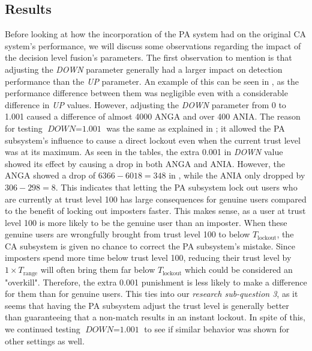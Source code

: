 \subsection{Results}

Before looking at how the incorporation of the PA system had on the original CA system's performance, we will discuss some observations regarding the impact of the decision level fusion's parameters.
The first observation to mention is that adjusting the \textit{DOWN} parameter generally had a larger impact on detection performance than the \textit{UP} parameter.
An example of this can be seen in , as the performance difference between them was negligible even with a considerable difference in \textit{UP} values.
However, adjusting the \textit{DOWN} parameter from 0 to 1.001 caused a difference of almost 4000 ANGA and over 400 ANIA.
The reason for testing $\textit{DOWN}=\text{1.001}$ was the same as explained in ; it allowed the PA subsystem's influence to cause a direct lockout even when the current trust level was at its maximum.
As seen in the tables, the extra 0.001 in \textit{DOWN} value showed its effect by causing a drop in both ANGA and ANIA. 
However, the ANGA showed a drop of $6366-6018 = 348$ in , while the ANIA only dropped by $306-298 = 8$.
This indicates that letting the PA subsystem lock out users who are currently at trust level 100 has large consequences for genuine users compared to the benefit of locking out imposters faster.
This makes sense, as a user at trust level 100 is more likely to be the genuine user than an imposter.
When these genuine users are wrongfully brought from trust level 100 to below $T_{\text{lockout}}$, the CA subsystem is given no chance to correct the PA subsystem's mistake.
Since imposters spend more time below trust level 100, reducing their trust level by $1\times T_{\text{range}}$ will often bring them far below $T_{\text{lockout}}$ which could be considered an "overkill".
Therefore, the extra 0.001 punishment is less likely to make a difference for them than for genuine users.
This ties into our \textit{research sub-question 3}, as it seems that having the PA subsystem adjust the trust level is generally better than guaranteeing that a non-match results in an instant lockout.
In spite of this, we continued testing $\textit{DOWN} = \text{1.001}$ to see if similar behavior was shown for other settings as well.

